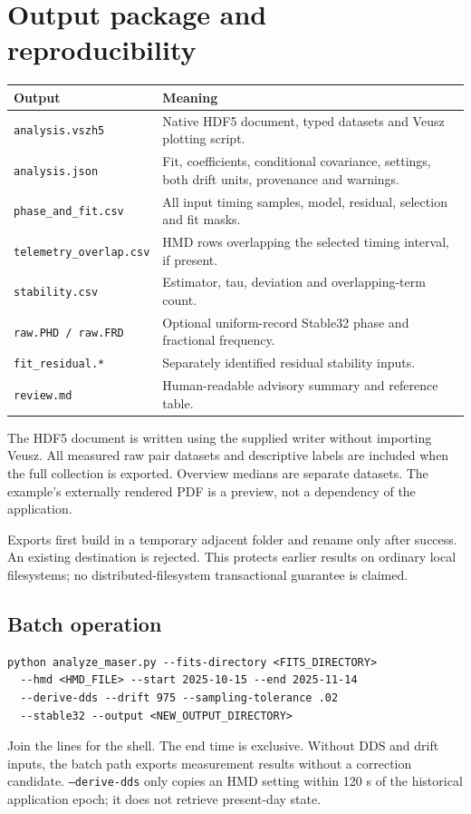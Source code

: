 \documentclass[11pt,a4paper]{article}
\begin{document}
\section{Output package and reproducibility}
\begin{longtable}{@{}p{.35\linewidth}p{.60\linewidth}@{}}
\toprule
Output & Meaning\\
\midrule
\texttt{analysis.vszh5} & Native HDF5 document, typed datasets and Veusz plotting script.\\
\texttt{analysis.json} & Fit, coefficients, conditional covariance, settings, both drift units, provenance and warnings.\\
\texttt{phase\_and\_fit.csv} & All input timing samples, model, residual, selection and fit masks.\\
\texttt{telemetry\_overlap.csv} & HMD rows overlapping the selected timing interval, if present.\\
\texttt{stability.csv} & Estimator, tau, deviation and overlapping-term count.\\
\texttt{raw.PHD / raw.FRD} & Optional uniform-record Stable32 phase and fractional frequency.\\
\texttt{fit\_residual.*} & Separately identified residual stability inputs.\\
\texttt{review.md} & Human-readable advisory summary and reference table.\\
\bottomrule
\end{longtable}

The HDF5 document is written using the supplied writer without importing
Veusz. All measured raw pair datasets and descriptive labels are included when
the full collection is exported. Overview medians are separate datasets.
The example's externally rendered PDF is a preview, not a dependency of the
application.

Exports first build in a temporary adjacent folder and rename only after
success. An existing destination is rejected. This protects earlier results
on ordinary local filesystems; no distributed-filesystem transactional
guarantee is claimed.

\subsection{Batch operation}
\begin{lstlisting}
python analyze_maser.py --fits-directory <FITS_DIRECTORY>
  --hmd <HMD_FILE> --start 2025-10-15 --end 2025-11-14
  --derive-dds --drift 975 --sampling-tolerance .02
  --stable32 --output <NEW_OUTPUT_DIRECTORY>
\end{lstlisting}
Join the lines for the shell. The end time is exclusive. Without DDS and drift
inputs, the batch path exports measurement results without a correction
candidate. \texttt{--derive-dds} only copies an HMD setting within 120 s of the
historical application epoch; it does not retrieve present-day state.
\end{document}
